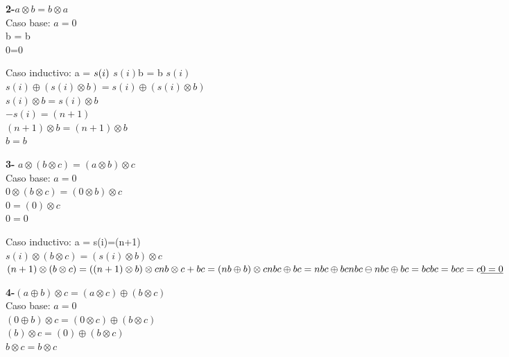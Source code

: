 \documentclass{article}
\begin{document}
\bigskip

\raggedright\textbf{2-}{$a \otimes b = b \otimes a$}\\
Caso base: $a=0$ \\ \otimes  b = b \\
0=0 \\\bigskip


Caso inductivo: a = $s(i)\\\medskip$
$s(i)$\otimes b = b \otimes $s(i)$ \\
 $s(i) \oplus (s(i) \otimes b) = s(i) \oplus (s(i) \otimes b)$\\
{$s(i) \otimes b = s(i) \otimes b$}\\
$-s(i)= (n+1) $\\
$(n+1)\otimes b =(n+1) \otimes b $\\
\underline{$b=b$}

 
\bigskip


\raggedright\textbf{3-} {$a \otimes (b \otimes c)=(a\otimes b)\otimes c$}\\
Caso base: $a=0$ \\\medskip
{$0 \otimes (b \otimes c)=(0\otimes b)\otimes c$}\\
{$0=(0)\otimes c$}\\
{$0=0$}\\
\medskip

Caso inductivo: a = s(i)=(n+1)\\\medskip
{$s(i) \otimes (b \otimes c)=(s(i)\otimes b)\otimes c$}\\ 
$(n+1) \otimes (b \otimes c) =((n+1) \otimes b) \otimes c \\
nb \otimes c+ bc = (nb \oplus b) \otimes c \\
nbc \oplus bc = nbc \oplus bc\\
nbc \ominus  nbc \oplus bc =bc\\
bc=bc\\
c=c\\

\underline{0=0}$\\



\bigskip


\raggedright\textbf{4-}{$(a\oplus b)\otimes c = (a\otimes c) \oplus (b \otimes c)$}\\
Caso base: $a=0$ \\\medskip
$(0\oplus b)\otimes c = (0\otimes c) \oplus (b \otimes c)$\\
$(b)\otimes c = (0) \oplus (b \otimes c)$\\
$b\otimes c = b \otimes c$\\\medskip
\end{document}
